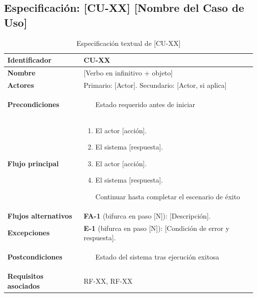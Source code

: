\documentclass[journal,onecolumn]{IEEEtran}
\begin{document}
\subsection{Especificación: [CU-XX] [Nombre del Caso de Uso]}

\begin{table}[H]
\caption{Especificación textual de [CU-XX]}
\label{tab:cu03}
\begin{tabularx}{\textwidth}{|l|X|}
\hline
\textbf{Identificador}       & CU-XX \\
\hline
\textbf{Nombre}              & [Verbo en infinitivo + objeto] \\
\hline
\textbf{Actores}             & Primario: [Actor]. Secundario: [Actor, si aplica] \\
\hline
\textbf{Precondiciones}      & \begin{enumerate}[leftmargin=*,topsep=0pt]
                                 \item [Estado requerido antes de iniciar]
                               \end{enumerate} \\
\hline
\textbf{Flujo principal}     & \begin{enumerate}[leftmargin=*,topsep=0pt]
                                 \item El actor [acción].
                                 \item El sistema [respuesta].
                                 \item El actor [acción].
                                 \item El sistema [respuesta].
                                 \item [Continuar hasta completar el escenario de éxito]
                               \end{enumerate} \\
\hline
\textbf{Flujos alternativos} & \textbf{FA-1} (bifurca en paso [N]): [Descripción]. \\
\hline
\textbf{Excepciones}         & \textbf{E-1} (bifurca en paso [N]): [Condición de error y respuesta]. \\
\hline
\textbf{Postcondiciones}     & \begin{enumerate}[leftmargin=*,topsep=0pt]
                                 \item [Estado del sistema tras ejecución exitosa]
                               \end{enumerate} \\
\hline
\textbf{Requisitos asociados} & RF-XX, RF-XX \\
\hline
\end{tabularx}
\end{table}
\end{document}
